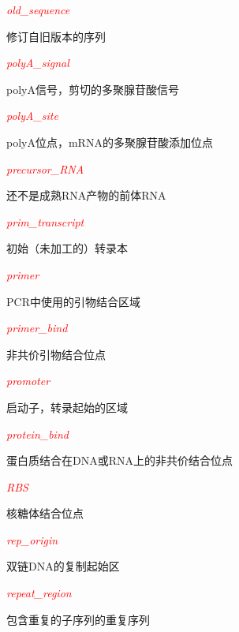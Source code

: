 \textcolor{red}{\textit{old\_sequence}}
\begin{adjustwidth}{1cm}{}
修订自旧版本的序列
\end{adjustwidth}

\textcolor{red}{\textit{polyA\_signal}}
\begin{adjustwidth}{1cm}{}
polyA信号，剪切的多聚腺苷酸信号
\end{adjustwidth}

\textcolor{red}{\textit{polyA\_site}}
\begin{adjustwidth}{1cm}{}
polyA位点，mRNA的多聚腺苷酸添加位点
\end{adjustwidth}

\textcolor{red}{\textit{precursor\_RNA}}
\begin{adjustwidth}{1cm}{}
还不是成熟RNA产物的前体RNA
\end{adjustwidth}

\textcolor{red}{\textit{prim\_transcript}}
\begin{adjustwidth}{1cm}{}
初始（未加工的）转录本
\end{adjustwidth}

\textcolor{red}{\textit{primer}}
\begin{adjustwidth}{1cm}{}
PCR中使用的引物结合区域
\end{adjustwidth}

\textcolor{red}{\textit{primer\_bind}}
\begin{adjustwidth}{1cm}{}
非共价引物结合位点
\end{adjustwidth}

\textcolor{red}{\textit{promoter}}
\begin{adjustwidth}{1cm}{}
启动子，转录起始的区域
\end{adjustwidth}

\textcolor{red}{\textit{protein\_bind}}
\begin{adjustwidth}{1cm}{}
蛋白质结合在DNA或RNA上的非共价结合位点
\end{adjustwidth}

\textcolor{red}{\textit{RBS}}
\begin{adjustwidth}{1cm}{}
核糖体结合位点
\end{adjustwidth}

\textcolor{red}{\textit{rep\_origin}}
\begin{adjustwidth}{1cm}{}
双链DNA的复制起始区
\end{adjustwidth}

\textcolor{red}{\textit{repeat\_region}}
\begin{adjustwidth}{1cm}{}
包含重复的子序列的重复序列
\end{adjustwidth}

